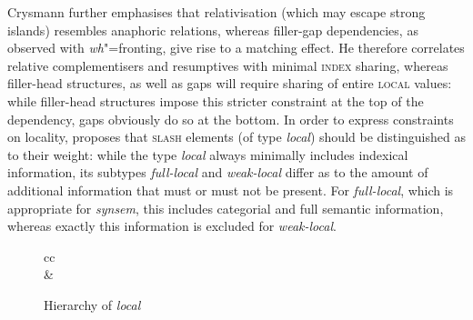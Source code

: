 \documentclass[output=paper
                ,modfonts
                ,nonflat
	        ,collection
	        ,collectionchapter
	        ,collectiontoclongg
 	        ,biblatex
                ,babelshorthands
                ,newtxmath
                ,draftmode
                ,colorlinks, citecolor=brown
]{./langsci/langscibook}
\begin{document}
{\noindent
Crysmann further emphasises that relativisation (which may escape
strong islands) resembles anaphoric relations, whereas filler-gap
dependencies, as observed with \emph{wh}"=fronting, give rise to a matching
effect. He therefore correlates relative complementisers and
resumptives with minimal \textsc{index} sharing, whereas filler-head
structures, as well as gaps will require sharing of entire
\textsc{local} values: while filler-head structures impose this
stricter constraint at the top of the dependency, gaps obviously do so
at the bottom. In order to express constraints on locality,
\citet{Crysmann:12} proposes that \textsc{slash} elements (of type
\textit{local}) should be distinguished as to their weight: while the
type \textit{local} always minimally includes indexical information,
its subtypes \textit{full-local} and \textit{weak-local} differ as to
the amount of additional information that must or must not be
present. For \textit{full-local}, which is appropriate for
\textit{synsem}, this includes categorial and full semantic
information, whereas exactly this information is excluded for
\textit{weak-local}.



\begin{figure}[htb]
  \centering
  
  \begin{tabular}{cc}
    \\[4em]
    &
  \end{tabular}

  
  
  \caption{\label{fig:local}Hierarchy of \textit{local} \citep{Crysmann:12}}
  
\end{figure}

}
\end{document}
